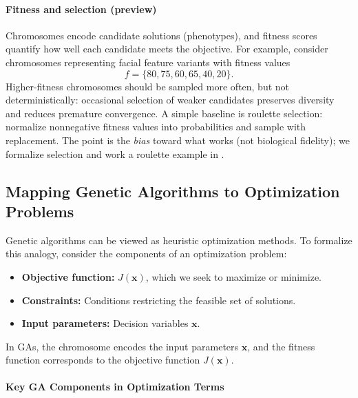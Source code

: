 \paragraph{Fitness and selection (preview)}
Chromosomes encode candidate solutions (phenotypes), and fitness scores quantify how well each candidate meets the objective. For example, consider chromosomes representing facial feature variants with fitness values
\[
f = \{80, 75, 60, 65, 40, 20\}.
\]
Higher-fitness chromosomes should be sampled more often, but not deterministically: occasional selection of weaker candidates preserves diversity and reduces premature convergence. A simple baseline is roulette selection: normalize nonnegative fitness values into probabilities and sample with replacement. The point is the \emph{bias} toward what works (not biological fidelity); we formalize selection and work a roulette example in .

\subsection{Mapping Genetic Algorithms to Optimization Problems}
\label{sec:evo_mapping_genetic_algorithms_to_optimization_problems}

Genetic algorithms can be viewed as heuristic optimization methods. To formalize this analogy, consider the components of an optimization problem:

\begin{itemize}
    \item \textbf{Objective function:} \( J(\mathbf{x}) \), which we seek to maximize or minimize.
    \item \textbf{Constraints:} Conditions restricting the feasible set of solutions.
    \item \textbf{Input parameters:} Decision variables \( \mathbf{x} \).
\end{itemize}

In GAs, the chromosome encodes the input parameters \( \mathbf{x} \), and the fitness function corresponds to the objective function \( J(\mathbf{x}) \).

\paragraph{Key GA Components in Optimization Terms}

